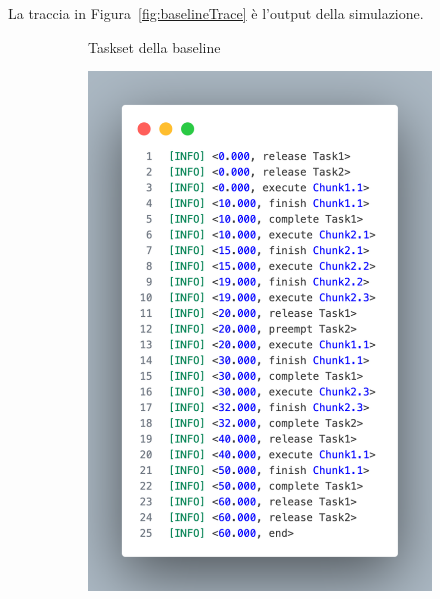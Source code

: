 La traccia in Figura~\ref{fig:baselineTrace} è l'output della simulazione.

\begin{figure}[htbp]
    \centering
    \begin{subfigure}{0.45\textwidth}
        \vfill
        \centering
        \caption{Taskset della baseline}
        \label{fig:baselineTaskset}
        \vfill
    \end{subfigure}
    \hfill
    \begin{subfigure}{0.45\textwidth}
        \vfill
        \centering
        \includegraphics[width=.9\textwidth]{immagini/trace baseline.pdf}

\end{subfigure}
\end{figure}
